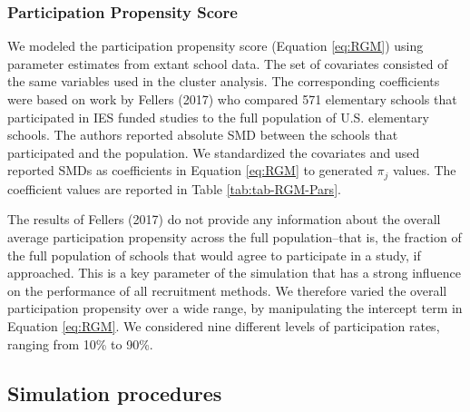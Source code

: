 \documentclass[english,man,floatsintext]{apa6}
\begin{document}
\hypertarget{participation-propensity-score}{%
\subsubsection{Participation Propensity Score}\label{participation-propensity-score}}

We modeled the participation propensity score (Equation \eqref{eq:RGM}) using parameter estimates from extant school data. The set of covariates consisted of the same variables used in the cluster analysis. The corresponding coefficients were based on work by Fellers (2017) who compared 571 elementary schools that participated in IES funded studies to the full population of U.S. elementary schools. The authors reported absolute SMD between the schools that participated and the population. We standardized the covariates and used reported SMDs as coefficients in Equation \eqref{eq:RGM} to generated \(\pi_j\) values. The coefficient values are reported in Table \ref{tab:tab-RGM-Pars}.

The results of Fellers (2017) do not provide any information about the overall average participation propensity across the full population--that is, the fraction of the full population of schools that would agree to participate in a study, if approached. This is a key parameter of the simulation that has a strong influence on the performance of all recruitment methods. We therefore varied the overall participation propensity over a wide range, by manipulating the intercept term in Equation \eqref{eq:RGM}. We considered nine different levels of participation rates, ranging from 10\% to 90\%.

\hypertarget{simulation-procedures}{%
\subsection{Simulation procedures}\label{simulation-procedures}}
\end{document}
